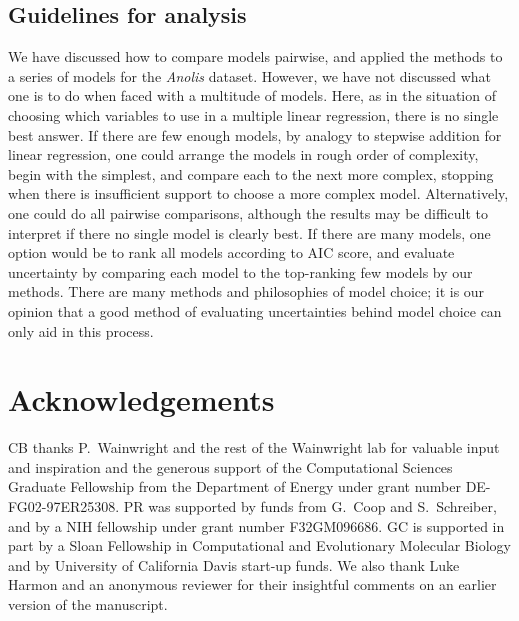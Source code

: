 \subsection{Guidelines for analysis}
We have discussed how to compare models pairwise,
and applied the methods to a series of models for the {\it Anolis} dataset.
However, we have not discussed what one is to do when faced with a multitude of models.
Here, as in the situation of choosing which variables to use in a multiple linear regression,
there is no single best answer.
If there are few enough models, by analogy to stepwise addition for linear regression,
one could arrange the models in rough order of complexity, 
begin with the simplest,
and compare each to the next more complex, 
stopping when there is insufficient support to choose a more complex model.
Alternatively, one could do all pairwise comparisons,
although the results may be difficult to interpret if there no single model is clearly best.
If there are many models, 
one option would be to rank all models according to AIC score,
and evaluate uncertainty by comparing each model to the top-ranking few models by our methods.
There are many methods and philosophies of model choice;
it is our opinion that a good method of evaluating uncertainties behind model choice
can only aid in this process.


\section{Acknowledgements}
CB thanks P.\ Wainwright and the rest of the Wainwright lab for valuable input and inspiration 
and the generous support of the Computational Sciences Graduate Fellowship from the Department of Energy under grant number DE-FG02-97ER25308. 
PR was supported by funds from G.\ Coop and S.\ Schreiber, and by a NIH fellowship under grant number F32GM096686.
GC is supported in part by a Sloan Fellowship in Computational and Evolutionary Molecular Biology and by University of California Davis start-up funds. 
We also thank Luke Harmon and an anonymous reviewer for their insightful comments on an earlier version of the manuscript.  



